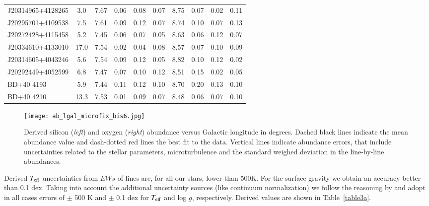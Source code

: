 \documentclass{aa} %
\begin{document}
\begin{table*}[t!]
\begin{tabular}{lccccccccc}
\small{J20314965+4128265}& \small{3.0} & \small{7.67} &\small{0.06} &\small{0.08} &\small{0.07} & \small{8.75} & \small{0.07} &\small{0.02} &\small{0.11}\\ 
\small{J20295701+4109538}& \small{7.5} & \small{7.61} &\small{0.09} & \small{0.12} &\small{0.07} & \small{8.74} & \small{0.10} &\small{0.07} &\small{0.13}\\ 	
\small{J20272428+4115458}& \small{5.2} & \small{7.45} &\small{0.06} &\small{0.07} &\small{0.05} &  \small{8.63} & \small{0.06} &\small{0.12} &\small{0.07}\\
\small{J20334610+4133010}& \small{17.0}& \small{7.54} &\small{0.02} & \small{0.04} &\small{0.08} & \small{8.57} & \small{0.07} &\small{0.10} &\small{0.09}\\
\small{J20314605+4043246}& \small{5.6} & \small{7.54} &\small{0.09} & \small{0.12} &\small{0.05} & \small{8.82} & \small{0.10} &\small{0.12} &\small{0.02}\\  
\small{J20292449+4052599}& \small{6.8} & \small{7.47} &\small{0.07} & \small{0.10} &\small{0.12} & \small{8.51} & \small{0.15} &\small{0.02} &\small{0.05}\\   
\small{BD+40 4193}& \small{5.9}& \small{7.44} & \small{0.11} &\small{0.12} &\small{0.10} & \small{8.70} & \small{0.20} &\small{0.13} &\small{0.10}\\ 
\small{BD+40 4210}& \small{13.3}& \small{7.53} &\small{0.01} &\small{0.09} &\small{0.07} &  \small{8.48} & \small{0.06} &\small{0.07} &\small{0.10}\\
\hline
		\end{tabular}
\end{table*}

\begin{figure*}[t!]
\centering
\texttt{[image: ab\_lgal\_microfix\_bis6.jpg]}
\caption{ Derived silicon (\textit{left}) and oxygen (\textit{right}) abundance versus Galactic longitude in degrees. Dashed black lines indicate the mean abundance value and dash-dotted red lines the best fit to the data. Vertical lines indicate abundance errors, that include uncertainties related to the stellar parameters, microturbulence and the standard weighed deviation in the line-by-line abundances.}
\label{fig10} 
\end{figure*}	


Derived $T_{\rm eff}$ uncertainties from $EWs$ of  lines are, for all our stars, lower than 500K. For the surface gravity we obtain an accuracy better than 0.1 dex. Taking into account the additional uncertainty sources (like continuum normalization) we follow the reasoning by \cite{sabin17} and adopt in all cases errors of $\pm$ 500 K and $\pm$ 0.1 dex for $T_{\rm eff}$  and log $g$, respectively. Derived values are shown in Table~\ref{table3a}.
\end{document}
